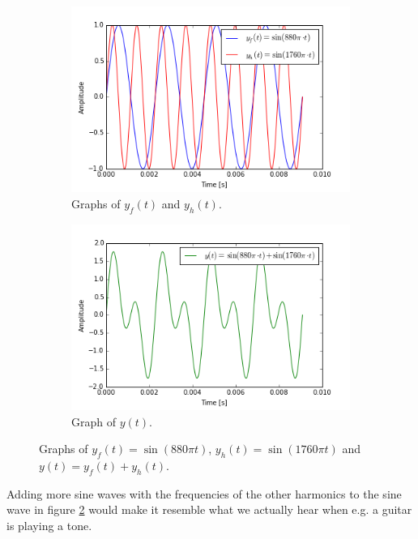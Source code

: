 \begin{figure}[H]
\centering
\begin{subfigure}{0.49\textwidth}
\centering
\includegraphics[width = \textwidth]{figures/Music/sine_fundamental_harmonic.png}
\caption{Graphs of $y_f(t)$ and $y_h(t)$.}
\label{fig:sine_single}
\end{subfigure}
\begin{subfigure}{0.49\textwidth}
\centering
\includegraphics[width = \textwidth]{figures/Music/sine_sum.png}
\caption{Graph of $y(t)$.}
\label{fig:sine_sum}
\end{subfigure}
\caption{Graphs of $y_f(t) = \sin(880 \pi t)$, $y_h(t) = \sin(1760 \pi t)$ and $y(t) = y_f(t) + y_h(t)$.}
\label{fig:sine_all}
\end{figure}

\noindent
Adding more sine waves with the frequencies of the other harmonics to the sine wave in figure \ref{fig:sine_sum} would make it resemble what we actually hear when e.g. a guitar is playing a tone.

